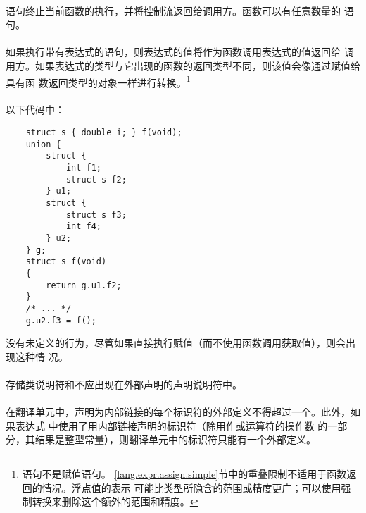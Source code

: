 {\semantic
\paragraph{}
语句终止当前函数的执行，并将控制流返回给调用方。函数可以有任意数量的
语句。

\paragraph{}
如果执行带有表达式的语句，则表达式的值将作为函数调用表达式的值返回给
调用方。如果表达式的类型与它出现的函数的返回类型不同，则该值会像通过赋值给具有函
数返回类型的对象一样进行转换。\footnote{语句不是赋值语句。
\ref{lang.expr.assign.simple}节中的重叠限制不适用于函数返回的情况。浮点值的表示
可能比类型所隐含的范围或精度更广；可以使用强制转换来删除这个额外的范围和精度。}

\paragraph{}
\ex* 以下代码中：
\begin{lstlisting}
    struct s { double i; } f(void);
    union {
        struct {
            int f1;
            struct s f2;
        } u1;
        struct {
            struct s f3;
            int f4;
        } u2;
    } g;
    struct s f(void)
    {
        return g.u1.f2;
    }
    /* ... */
    g.u2.f3 = f();
\end{lstlisting}
没有未定义的行为，尽管如果直接执行赋值（而不使用函数调用获取值），则会出现这种情
况。

\syntax
\paragraph{}

\constraint
\paragraph{}
存储类说明符和不应出现在外部声明的声明说明符中。

\paragraph{}
在翻译单元中，声明为内部链接的每个标识符的外部定义不得超过一个。此外，如果表达式
中使用了用内部链接声明的标识符（除用作或运算符的操作数
的一部分，其结果是整型常量），则翻译单元中的标识符只能有一个外部定义。

}
